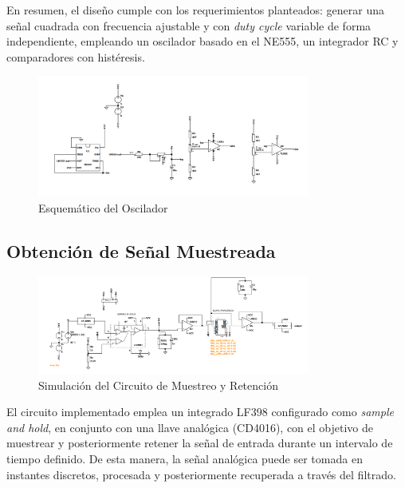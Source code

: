 En resumen, el diseño cumple con los requerimientos planteados: generar una señal cuadrada con frecuencia ajustable y con \textit{duty cycle} variable de forma independiente, empleando un oscilador basado en el NE555, un integrador RC y comparadores con histéresis.
\begin{figure}[H]
    \centering
    \includegraphics[width=0.8\textwidth]{Imagenes/esquematico_oscilador.png}
    \caption{Esquemático del Oscilador}
    \label{esquematico_oscilador}
\end{figure}


\subsection{Obtención de Señal Muestreada}

\begin{figure}[H]
    \centering
    \includegraphics[width=0.8\textwidth]{Imagenes/esquematico_gral.png}
    \caption{Simulación del Circuito de Muestreo y Retención}
    \label{fig:Simulacion_Sample_and_Hold}
\end{figure}

El circuito implementado emplea un integrado LF398 configurado como \textit{sample and hold}, en conjunto 
con una llave analógica (CD4016), con el objetivo de muestrear y posteriormente retener la señal de entrada 
durante un intervalo de tiempo definido. De esta manera, la señal analógica puede ser tomada en instantes 
discretos, procesada y posteriormente recuperada a través del filtrado.


